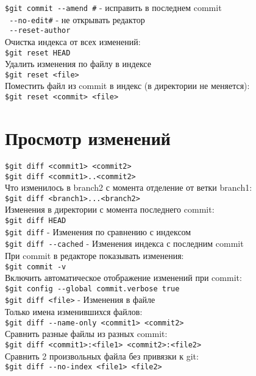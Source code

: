 \documentclass[12pt, a4paper]{article}
\begin{document}
\noindent \texttt{\$git commit {-}-amend \indent\#}  - исправить в последнем commit \\
\indent \texttt{ {-}-no-edit\indent\#} - не открывать редактор \\ 
\indent \texttt{ {-}-reset-author} \\

\noindent Очистка индекса от всех изменений: \\
\indent \texttt{\$git reset HEAD} \\
\noindent Удалить изменения по файлу в индексе \\
\indent \texttt{\$git reset <file>} \\
\noindent Поместить файл из commit в индекс (в директории не меняется):\\
\indent \texttt{\$git reset <commit> <file>} \\


\section{Просмотр изменений}

\noindent \texttt{\$git diff <commit1> <commit2>} \\
\noindent \texttt{\$git diff <commit1>..<commit2>} \\

\noindent Что изменилось в branch2 с момента отделение от ветки branch1: \\
\indent \texttt{\$git diff <branch1>...<branch2>} \\
\noindent Изменения в директории с момента последнего commit: \\
\indent \texttt{\$git diff HEAD} \\
\noindent \texttt{\$git diff} - Изменения по сравнению с индексом \\
\noindent \texttt{\$git diff {-}-cached} - Изменения индекса с последним commit \\

\noindent При commit в редакторе показывать изменения: \\
\indent \texttt{\$git commit -v} \\
\noindent Включить автоматическое отображение изменений при commit: \\
\indent \texttt{\$git config {-}-global commit.verbose true} \\

\noindent \texttt{\$git diff <file>} - Изменения в файле \\
\noindent Только имена изменившихся файлов: \\
\indent \texttt{\$git diff {-}-name-only <commit1> <commit2>}\\
\noindent Сравнить разные файлы из разных commit: \\
\indent \texttt{\$git diff <commit1>:<file1> <commit2>:<file2>} \\
\noindent Сравнить 2 произвольных файла без привязки к git: \\
\indent \texttt{\$git diff {-}-no-index <file1> <file2>} \\
\end{document}

